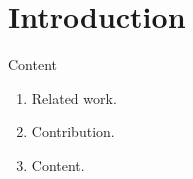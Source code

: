 \documentclass[sensors,article,submit,moreauthors,pdftex]{Definitions/mdpi}
\begin{document}


\section{Introduction}
Content
\begin{enumerate}[leftmargin=*,labelsep=4.9mm]
\item	Related work.
\item	Contribution.
\item	Content.
\end{enumerate}
\end{document}
